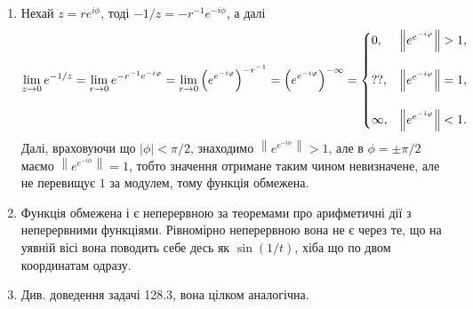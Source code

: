 \begin{solution}
    \begin{enumerate}
        \item Нехай $z = r e^{i \phi}$, тоді $-1 / z = - r^{-1} e^{-i \phi}$, а далі
        \[ \displaystyle\lim\limits_{z \to 0} e^{-1/z} = \displaystyle\lim\limits_{r \to 0} e^{- r^{-1} e^{-i \varphi}} = \displaystyle\lim\limits_{r \to 0} \left(e^{e^{-i \varphi}}\right)^{-r^{-1}} = \left(e^{e^{-i \varphi}}\right)^{-\infty} = \begin{cases} 0, & \left\|e^{e^{-i \varphi}}\right\| > 1, \\ \\ ??, & \left\|e^{e^{-i \varphi}}\right\| = 1, \\ \\ \infty, & \left\|e^{e^{-i \varphi}}\right\| < 1. \end{cases}\]
        Далі, враховуючи що $|\phi| < \pi / 2$, знаходимо $\left\|e^{e^{-i \phi}}\right\| > 1$, але в $\phi = \pm \pi / 2$ маємо $\left\|e^{e^{-i \phi}}\right\| = 1$, тобто значення отримане таким чином невизначене, але не перевищує $1$ за модулем, тому функція обмежена.
        \item Функція обмежена і є неперервною за теоремами про арифметичні дії з неперервними функціями. Рівномірно неперервною вона не є через те, що на уявній вісі вона поводить себе десь як $\sin (1 /t)$, хіба що по двом координатам одразу.
        \item Див. доведення задачі 128.3, вона цілком аналогічна.
    \end{enumerate}
\end{solution}
